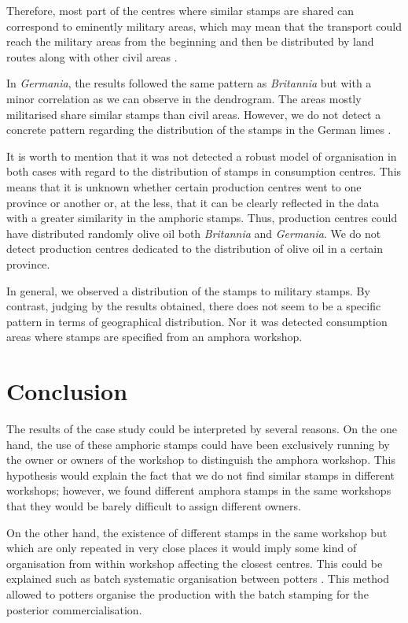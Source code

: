 \documentclass[review]{elsarticle}
\begin{document}
Therefore, most part of the centres where similar stamps are shared can correspond to eminently military areas, which may mean that the transport could reach the military areas from the beginning and then be distributed by land routes along with other civil areas \citep{carreras_britannia_1998,
ayllon_olive_2018}.

In \textit{Germania}, the results followed the same pattern as \textit{Britannia} but with a minor correlation as we can observe in the dendrogram. The areas mostly militarised share similar stamps than civil areas. However, we do not detect a concrete pattern regarding the distribution of the stamps in the German limes \citep{xanten2018}. 

It is worth to mention that it was not detected a robust model of organisation in both cases with regard to the distribution of stamps in consumption centres. This means
that it is unknown whether certain production centres went to one province or another or, at the
less, that it can be clearly reflected in the data with a greater similarity in the amphoric stamps. Thus, production centres could have distributed randomly olive oil both \textit{Britannia} and \textit{Germania}. We do not detect production centres dedicated to the distribution of olive oil in a certain province. 

In general, we observed a distribution of the stamps to military stamps. By contrast, judging by the results obtained, there does not seem to be a specific pattern in terms of geographical distribution. Nor it was detected consumption areas where stamps are specified from an amphora workshop. 


\section{Conclusion}


The results of the case study could be interpreted by several reasons. On the one hand, the use of these amphoric stamps could have been exclusively running by the owner or owners of the workshop to distinguish the amphora workshop. This hypothesis would explain the fact that we do not find similar stamps in different workshops; however, we found different amphora stamps in the same workshops that they would be barely difficult to assign different owners.

On the other hand, the existence of different stamps in the same workshop but which are only repeated in very close places it would imply some kind of organisation from within workshop affecting the closest centres. This could be explained such as batch systematic organisation between potters \citep{juanmorostesis}. 
This method allowed to potters organise the production with the batch stamping for the posterior commercialisation.
\end{document}
